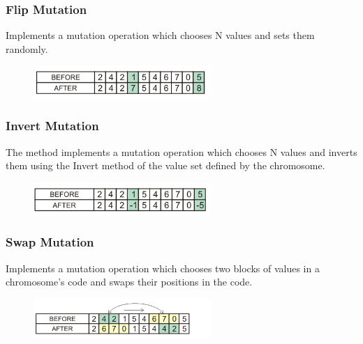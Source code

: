 \documentclass{beamer}%
\begin{document}
\begin{frame}
\frametitle{Flip Mutation}
Implements a mutation operation which chooses N values and sets them randomly.\\

\begin{figure}
\centering
  \includegraphics[width=0.6\textwidth]{images/8.png}
\end{figure}

\end{frame}


\begin{frame}
\frametitle{Invert Mutation}
The method implements a mutation operation which chooses N values and inverts them using the Invert method of the value set defined by the chromosome.\\

\begin{figure}
\centering
  \includegraphics[width=0.6\textwidth]{images/7.png}
\end{figure}

\end{frame}



\begin{frame}
\frametitle{Swap Mutation}
Implements a mutation operation which chooses two blocks of values in a chromosome's code and swaps their positions in the code.\\

\begin{figure}
\centering
  \includegraphics[width=0.6\textwidth]{images/9.png}
\end{figure}

\end{frame}
\end{document}
